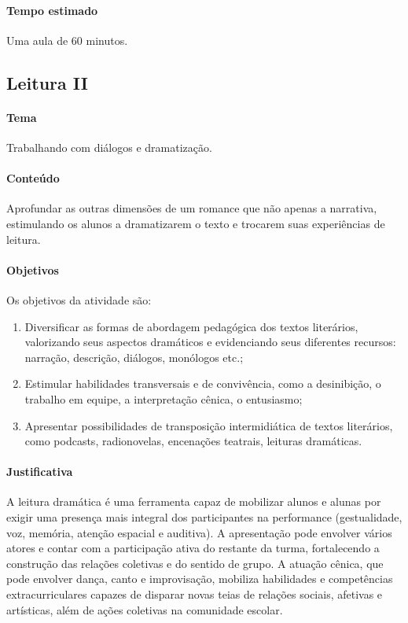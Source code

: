 \documentclass[12pt]{extarticle}
\begin{document}
\paragraph{Tempo estimado} Uma aula de 60 minutos.

\subsection{Leitura II}

\paragraph{Tema} Trabalhando com diálogos e dramatização.


\paragraph{Conteúdo} Aprofundar as outras dimensões de um romance que não apenas a narrativa, estimulando os alunos a dramatizarem o texto e trocarem suas experiências de leitura.

\paragraph{Objetivos}
Os objetivos da atividade são:
\begin{enumerate}
\item
Diversificar as formas de abordagem
pedagógica dos textos literários, valorizando seus aspectos dramáticos e
evidenciando seus diferentes recursos: narração, descrição, diálogos,
monólogos etc.; 

\item
Estimular habilidades transversais e de convivência,
como a desinibição, o trabalho em equipe, a interpretação cênica, o
entusiasmo;

\item
Apresentar possibilidades de transposição intermidiática
de textos literários, como podcasts, radionovelas, encenações teatrais,
leituras dramáticas.
\end{enumerate}

\paragraph{Justificativa}
A leitura dramática é uma ferramenta capaz de mobilizar alunos e alunas
por exigir uma presença mais integral dos participantes na performance
(gestualidade, voz, memória, atenção espacial e auditiva). A
apresentação pode envolver vários atores e contar com a participação
ativa do restante da turma, fortalecendo a construção das relações
coletivas e do sentido de grupo. A atuação cênica, que pode envolver
dança, canto e improvisação, mobiliza habilidades e competências
extracurriculares capazes de disparar novas teias de relações sociais,
afetivas e artísticas, além de ações coletivas na comunidade escolar.
\end{document}
